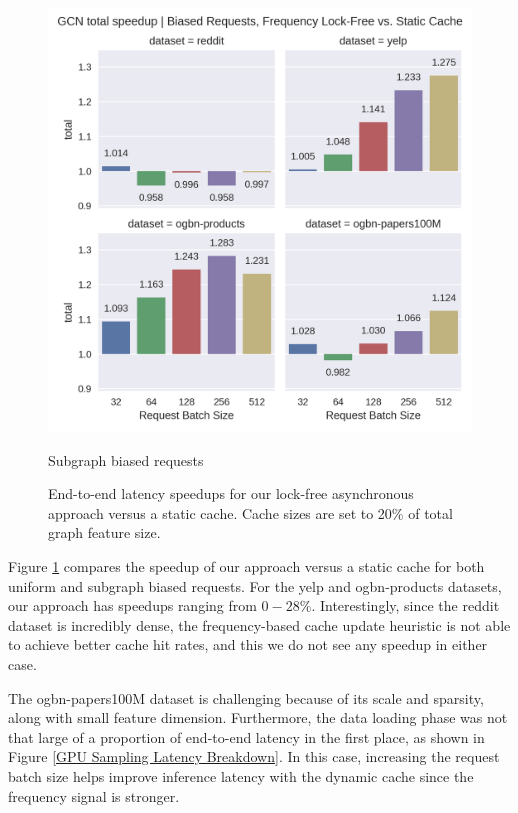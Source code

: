 \begin{figure}[h!]
\begin{minipage}[c]{0.499\textwidth}
        \includegraphics[width=\textwidth]{figures/speedup_GCN_total_bias.png}    
        \caption*{Subgraph biased requests}
    \end{minipage}
    \caption{End-to-end latency speedups for our lock-free asynchronous approach versus a static cache. Cache sizes are set to 20\% of total graph feature size.}
    \label{Eval: Speedups}
\end{figure}    
Figure \ref{Eval: Speedups} compares the speedup of our approach versus a static cache for both uniform and subgraph biased requests. For the yelp and ogbn-products datasets, our approach has speedups ranging from $0-28\%$. Interestingly, since the reddit dataset is incredibly dense, the frequency-based cache update heuristic is not able to achieve better cache hit rates, and this we do not see any speedup in either case. 

The ogbn-papers100M dataset is challenging because of its scale and sparsity, along with small feature dimension. Furthermore, the data loading phase was not that large of a proportion of end-to-end latency in the first place, as shown in Figure \ref{GPU Sampling Latency Breakdown}. In this case, increasing the request batch size helps improve inference latency with the dynamic cache since the frequency signal is stronger.

